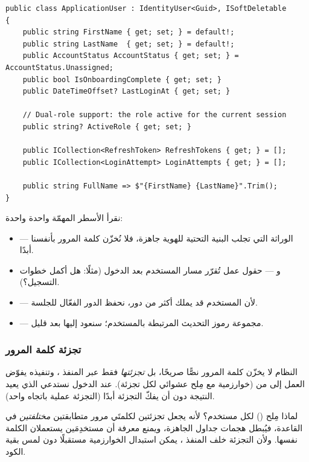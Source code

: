 \begin{english}
\begin{lstlisting}[language={[Sharp]C}]
public class ApplicationUser : IdentityUser<Guid>, ISoftDeletable
{
    public string FirstName { get; set; } = default!;
    public string LastName  { get; set; } = default!;
    public AccountStatus AccountStatus { get; set; } = AccountStatus.Unassigned;
    public bool IsOnboardingComplete { get; set; }
    public DateTimeOffset? LastLoginAt { get; set; }

    // Dual-role support: the role active for the current session
    public string? ActiveRole { get; set; }

    public ICollection<RefreshToken> RefreshTokens { get; } = [];
    public ICollection<LoginAttempt> LoginAttempts { get; } = [];

    public string FullName => $"{FirstName} {LastName}".Trim();
}
\end{lstlisting}
\end{english}

نقرأ الأسطر المهمّة واحدة واحدة:
\begin{itemize}
\item {} — الوراثة التي تجلب البنية التحتية للهوية جاهزة،
  فلا نُخزّن كلمة المرور بأنفسنا أبدًا.
\item {} و — حقول عمل تُقرّر مسار
  المستخدم بعد الدخول (مثلًا: هل أكمل خطوات التسجيل؟).
\item {} — لأن المستخدم قد يملك أكثر من دور، نحفظ الدور الفعّال للجلسة.
\item {} — مجموعة رموز التحديث المرتبطة بالمستخدم؛ سنعود إليها بعد قليل.
\end{itemize}

\subsubsection{تجزئة كلمة المرور}
النظام لا يخزّن كلمة المرور نصًّا صريحًا، بل \emph{تجزئتها} فقط عبر المنفذ
، وتنفيذه  يفوّض العمل إلى
 من  (خوارزمية  مع مِلح
عشوائي لكل تجزئة). عند الدخول نستدعي  الذي يعيد النتيجة
دون أن يفكّ التجزئة أبدًا (التجزئة عملية باتجاه واحد).

\begin{secnote}
لماذا مِلح () لكل مستخدم؟ لأنه يجعل تجزئتين لكلمتَي مرور متطابقتين
\emph{مختلفتين} في القاعدة، فيُبطل هجمات جداول  الجاهزة، ويمنع
معرفة أن مستخدِمَين يستعملان الكلمة نفسها. ولأن التجزئة خلف المنفذ
، يمكن استبدال الخوارزمية مستقبلًا دون لمس بقية الكود.
\end{secnote}

